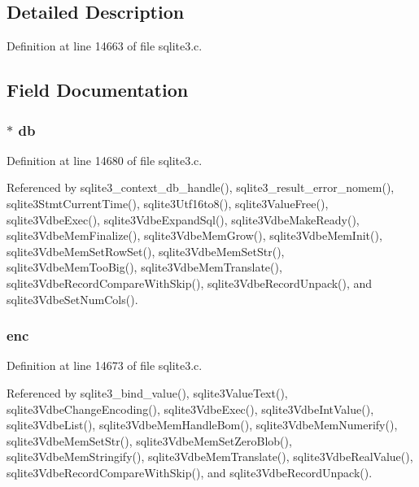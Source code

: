 \subsection{Detailed Description}


Definition at line 14663 of file sqlite3.\+c.



\subsection{Field Documentation}
\hypertarget{struct_mem_ad6e663497d2c934364b3bcf07496b30b}{}
\subsubsection[{db}]{$\ast$ db}\label{struct_mem_ad6e663497d2c934364b3bcf07496b30b}


Definition at line 14680 of file sqlite3.\+c.



Referenced by sqlite3\+\_\+context\+\_\+db\+\_\+handle(), sqlite3\+\_\+result\+\_\+error\+\_\+nomem(), sqlite3\+Stmt\+Current\+Time(), sqlite3\+Utf16to8(), sqlite3\+Value\+Free(), sqlite3\+Vdbe\+Exec(), sqlite3\+Vdbe\+Expand\+Sql(), sqlite3\+Vdbe\+Make\+Ready(), sqlite3\+Vdbe\+Mem\+Finalize(), sqlite3\+Vdbe\+Mem\+Grow(), sqlite3\+Vdbe\+Mem\+Init(), sqlite3\+Vdbe\+Mem\+Set\+Row\+Set(), sqlite3\+Vdbe\+Mem\+Set\+Str(), sqlite3\+Vdbe\+Mem\+Too\+Big(), sqlite3\+Vdbe\+Mem\+Translate(), sqlite3\+Vdbe\+Record\+Compare\+With\+Skip(), sqlite3\+Vdbe\+Record\+Unpack(), and sqlite3\+Vdbe\+Set\+Num\+Cols().

\hypertarget{struct_mem_a9c71ab1f0d39a2b088a6d8a1093159c0}{}
\subsubsection[{enc}]{ enc}\label{struct_mem_a9c71ab1f0d39a2b088a6d8a1093159c0}


Definition at line 14673 of file sqlite3.\+c.



Referenced by sqlite3\+\_\+bind\+\_\+value(), sqlite3\+Value\+Text(), sqlite3\+Vdbe\+Change\+Encoding(), sqlite3\+Vdbe\+Exec(), sqlite3\+Vdbe\+Int\+Value(), sqlite3\+Vdbe\+List(), sqlite3\+Vdbe\+Mem\+Handle\+Bom(), sqlite3\+Vdbe\+Mem\+Numerify(), sqlite3\+Vdbe\+Mem\+Set\+Str(), sqlite3\+Vdbe\+Mem\+Set\+Zero\+Blob(), sqlite3\+Vdbe\+Mem\+Stringify(), sqlite3\+Vdbe\+Mem\+Translate(), sqlite3\+Vdbe\+Real\+Value(), sqlite3\+Vdbe\+Record\+Compare\+With\+Skip(), and sqlite3\+Vdbe\+Record\+Unpack().

